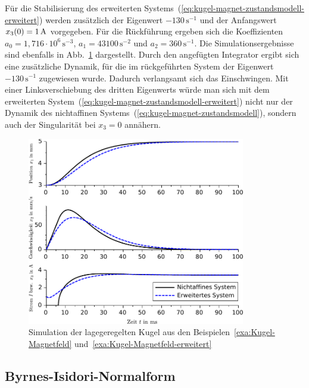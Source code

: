 \begin{example}
Für die Stabilisierung des erweiterten Systems~(\ref{eq:kugel-magnet-zustandsmodell-erweitert})
werden zusätzlich der Eigenwert $-130\,\text{s}^{-1}$ und der Anfangswert
$x_{3}(0)=1\,\text{\text{A}}$ vorgegeben. Für die Rückführung ergeben
sich die Koeffizienten $a_{0}=1,716\cdot10^{6}\,\text{s}^{-3}$, $a_{1}=43100\,\text{s}^{-2}$
und $a_{2}=360\,\text{s}^{-1}$. Die Simulationsergebnisse sind ebenfalls
in Abb.~\ref{fig:Kugel-Magnet-Simulation-erweitert} dargestellt.
Durch den angefügten Integrator ergibt sich eine zusätzliche Dynamik,
für die im rückgeführten System der Eigenwert $-130\,\text{s}^{-1}$
zugewiesen wurde. Dadurch verlangsamt sich das Einschwingen. Mit einer
Linksverschiebung des dritten Eigenwerts würde man sich mit dem erweiterten
System~(\ref{eq:kugel-magnet-zustandsmodell-erweitert}) nicht nur
der Dynamik des nichtaffinen Systems~(\ref{eq:kugel-magnet-zustandsmodell}),
sondern auch der Singularität bei $x_{3}=0$ annähern.
\end{example}
\begin{figure}
\begin{centering}
\includegraphics[width=0.85\textwidth]{Kugel_Magnet3}
\par\end{centering}
\caption{Simulation der lagegeregelten Kugel aus den Beispielen~\ref{exa:Kugel-Magnetfeld}
und~\ref{exa:Kugel-Magnetfeld-erweitert}\label{fig:Kugel-Magnet-Simulation-erweitert}}
\end{figure}


\subsection{Byrnes-Isidori-Normalform}

